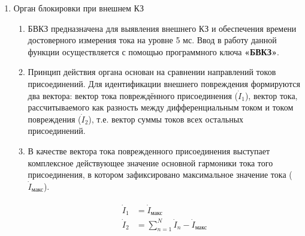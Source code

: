 \begin{enumerate}[label=\arabic{section}.\arabic{subsection}.\arabic{enumi}, labelsep=4pt, leftmargin=0pt, itemindent=57pt, itemsep=0pt, parsep=5pt]
\begin{enumerate}[label=\arabic{section}.\arabic{subsection}.\arabic{enumi}.\arabic*, labelsep=4pt, leftmargin=0em, itemindent=65pt, parsep=0pt]
\item
Выпрямленный мгновенный дифференциальный ток рассчитывается как модуль суммы мгновенных
значений токов присоединений, входящих в зону действия защиты:
\begin{align}
i_{a\textmd{д}}=\mid \sum_{n=1}^N i_{a,\,n} \mid, \\
i_{b\textmd{д}}=\mid \sum_{n=1}^N i_{b,\,n} \mid, \\
i_{c\textmd{д}}=\mid \sum_{n=1}^N i_{c,\,n} \mid,
\end{align}

\end{enumerate}


\item Орган блокировки при внешнем КЗ

\begin{enumerate}[label=\arabic{section}.\arabic{subsection}.\arabic{enumi}.\arabic*, labelsep=4pt, leftmargin=0em, itemindent=65pt, parsep=0pt]

\item
БВКЗ предназначена для выявления внешнего КЗ и обеспечения времени достоверного измерения тока
на уровне 5 мс. Ввод в работу данной функции осуществляется с помощью программного ключа \textbf{«БВКЗ»}.

\item
Принцип действия органа основан на сравнении направлений токов присоединений. Для идентификации
внешнего повреждения формируются два вектора: вектор тока повреждённого присоединения ($ \dot{I}_1 $), вектор
тока, рассчитываемого как разность между дифференциальным током и током повреждения ($ \dot{I}_2 $), т.е. вектор
суммы токов всех остальных присоединений.

\item
В качестве вектора тока поврежденного присоединения выступает комплексное действующее значение
основной гармоники тока того присоединения, в котором зафиксировано максимальное значение тока ($ \dot{I}_\textit{макс} $).

\begin{align}
\begin{split}
\dot{I}_1&=\dot{I}_\textit{макс}\\
\dot{I}_2&=\sum_{n=1}^N \dot{I}_{n} - \dot{I}_\textit{макс}
\end{split}
\end{align}


\end{enumerate}
\end{enumerate}
